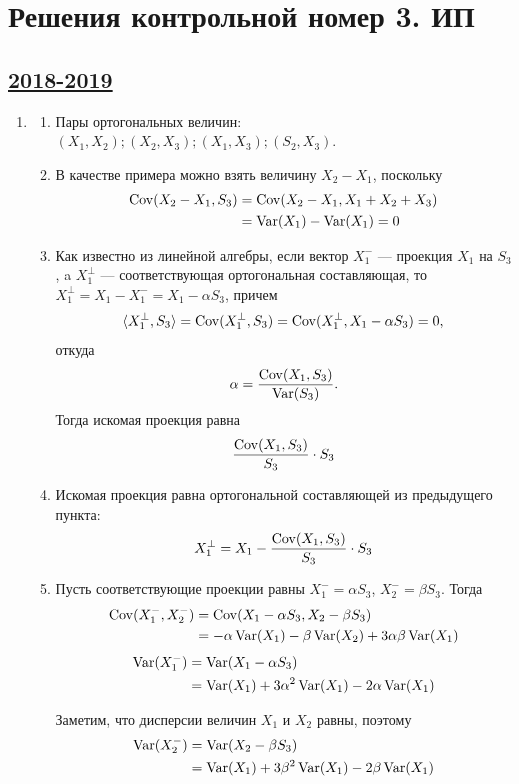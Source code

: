 \thispagestyle{empty}
\section{Решения контрольной номер 3. ИП}




\subsection[2018-2019]{\hyperref[sec:kr_03_ip_2018_2019]{2018-2019}}
\label{sec:sol_kr_03_ip_2018_2019}

\begin{enumerate}
\item
\begin{enumerate}
\item Пары ортогональных величин: $(X_1,X_2); (X_2,X_3); (X_1,X_3); (S_2,X_3)$.
\item В качестве примера можно взять величину $X_2-X_1$, поскольку
\begin{align*}
\operatorname{Cov}(X_2-X_1,S_3) &= \operatorname{Cov}(X_2-X_1,X_1+X_2+X_3) \\
&= \operatorname{Var}(X_1)-\operatorname{Var}(X_1)=0
\end{align*}
\item Как известно из линейной алгебры, если вектор $X^-_1$ — проекция $X_1$ на $S_3$,
a $X^{\perp}_1$ — соответствующая ортогональная составляющая, то $X^{\perp}_1=X_1-X^-_1 = X_1-\alpha S_3$,
причем
\[
\langle X^{\perp}_1,S_3\rangle = \operatorname{Cov}(X^{\perp}_1,S_3) = \operatorname{Cov}(X^{\perp}_1,X_1-\alpha S_3) = 0,
\]
откуда
\[
\alpha = \frac{\operatorname{Cov}(X_1,S_3)}{\operatorname{Var}(S_3)}.
\]
Тогда искомая проекция равна
\[
\frac{\operatorname{Cov}(X_1,S_3)}{S_3}\cdot S_3
\]
\item Искомая проекция равна ортогональной составляющей из предыдущего пункта:
\[
X^{\perp}_1 = X_1 - \frac{\operatorname{Cov}(X_1,S_3)}{S_3}\cdot S_3
\]
\item Пусть соответствующие проекции равны $X^-_1 = \alpha S_3$, $X^-_2 = \beta S_3$.
Тогда
\begin{align*}
\operatorname{Cov}(X^-_1,X^-_2) &= \operatorname{Cov}(X_1-\alpha S_3,X_2 - \beta S_3) \\
&=-\alpha\operatorname{Var}(X_1)-\beta\operatorname{Var}(X_2)+3\alpha\beta\operatorname{Var}(X_1)
\end{align*}
\begin{align*}
\operatorname{Var}(X^-_1) &= \operatorname{Var}(X_1 - \alpha S_3)\\
&= \operatorname{Var}(X_1) + 3\alpha^2\operatorname{Var}(X_1) - 2\alpha\operatorname{Var}(X_1)
\end{align*}

Заметим, что дисперсии величин $X_1$ и $X_2$ равны, поэтому
\begin{align*}
\operatorname{Var}(X^-_2) &= \operatorname{Var}(X_2 - \beta S_3)\\
&= \operatorname{Var}(X_1) + 3\beta^2 \operatorname{Var}(X_1) - 2\beta\operatorname{Var}(X_1)
\end{align*}


\end{enumerate}
\end{enumerate}
